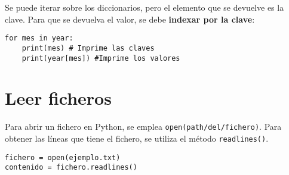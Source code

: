 Se puede iterar sobre los diccionarios, pero el  elemento que se devuelve es la clave. Para que se devuelva el valor, se debe \textbf{indexar por la clave}:
\begin{lstlisting}
for mes in year:
	print(mes) # Imprime las claves
	print(year[mes]) #Imprime los valores
\end{lstlisting}

\section{Leer ficheros}
Para abrir un fichero en Python, se emplea \texttt{open(path/del/fichero)}. Para obtener las líneas que tiene el fichero, se utiliza el método \texttt{readlines()}.
\begin{lstlisting}
fichero = open(ejemplo.txt)
contenido = fichero.readlines()
\end{lstlisting}